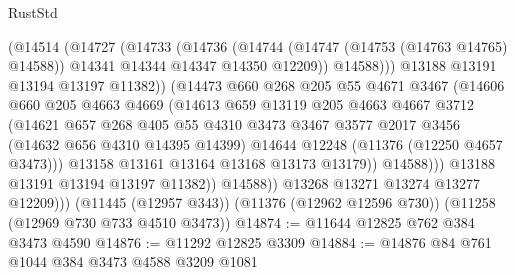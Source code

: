 \begin{lexlean}{RustStd}
\begin{coremodule}
{{{{{{{{{{{{{{{{{{{                          (@14514
                            (@14727
                              (@14733
                                (@14736
                                  (@14744
                                    (@14747 (@14753 (@14763 @14765) @14588))
                                    @14341
                                    @14344
                                    @14347
                                    @14350
                                    @12209))
                                @14588)))
                          @13188
                          @13191
                          @13194
                          @13197
                          @11382))
                      (@14473
                        @660
                        @268
                        @205
                        @55
                        @4671
                        @3467
                        (@14606
                          @660
                          @205
                          @4663
                          @4669
                          (@14613
                            @659
                            @13119
                            @205
                            @4663
                            @4667
                            @3712
                            (@14621
                              @657
                              @268
                              @405
                              @55
                              @4310
                              @3473
                              @3467
                              @3577
                              @2017
                              @3456
                              (@14632 @656 @4310 @14395 @14399)
                              @14644
                              @12248
                              (@11376 (@12250 @4657 @3473)))
                            @13158
                            @13161
                            @13164
                            @13168
                            @13173
                            @13179))
                        @14588)))
                  @13188
                  @13191
                  @13194
                  @13197
                  @11382))
              @14588))
          @13268
          @13271
          @13274
          @13277
          @12209)))
    (@11445 (@12957 @343))
    (@11376 (@12962 @12596 @730))
    (@11258 (@12969 @730 @733 @4510 @3473))
@14874 := @11644 @12825 @762 @384 @3473 @4590
@14876 := @11292 @12825 @3309
@14884 := @14876 @84 @761 @1044 @384 @3473 @4588 @3209 @1081
}}}}}}}}}}}}}}}}}}}
\end{coremodule}
\end{lexlean}

